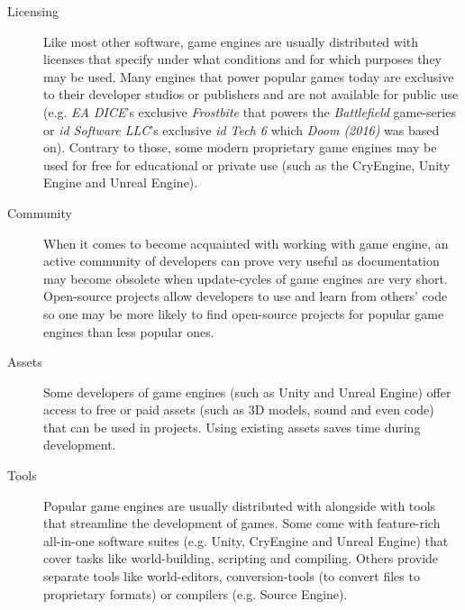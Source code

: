 \begin{description}
\item [Licensing] Like most other software, game engines are usually distributed with licenses that specify under what conditions and for which purposes they may be used. Many engines that power popular games today are exclusive to their developer studios or publishers and are not available for public use (e.g. \emph{EA DICE}'s exclusive \emph{Frostbite} that powers the \emph{Battlefield} game-series or \emph{id Software LLC}'s exclusive \emph{id Tech 6} which \emph{Doom (2016)} was based on). Contrary to those, some modern proprietary game engines may be used for free for educational or private use (such as the CryEngine, Unity Engine and Unreal Engine).
\item [Community] When it comes to become acquainted with working with game engine, an active community of developers can prove very useful as documentation may become obsolete when update-cycles of game engines are very short. Open-source projects allow developers to use and learn from others' code so one may be more likely to find open-source projects for popular game engines than less popular ones.
\item [Assets] Some developers of game engines (such as Unity and Unreal Engine) offer access to free or paid assets (such as 3D models, sound and even code) that can be used in projects. Using existing assets saves time during development.
\item [Tools] Popular game engines are usually distributed with alongside with tools that streamline the development of games. Some come with feature-rich all-in-one software suites (e.g. Unity, CryEngine and Unreal Engine) that cover tasks like world-building, scripting and compiling. Others provide separate tools like world-editors, conversion-tools (to convert files to proprietary formats) or compilers (e.g. Source Engine).
\end{description}

